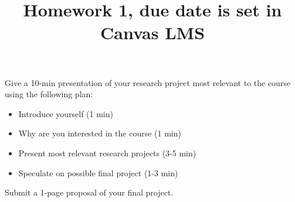 \documentclass{homework}
\begin{document}
\title{Homework 1, due date is set in Canvas LMS}
\maketitle

Give a 10-min presentation of your research project most relevant to the course using the following plan:
\begin{itemize}
\item Introduce yourself (1 min)
\item Why are you interested in the course (1 min)
\item Present most relevant research projects (3-5 min)
\item Speculate on possible final project (1-3 min)
\end{itemize}  
Submit a 1-page proposal of your final project.
\end{document}
